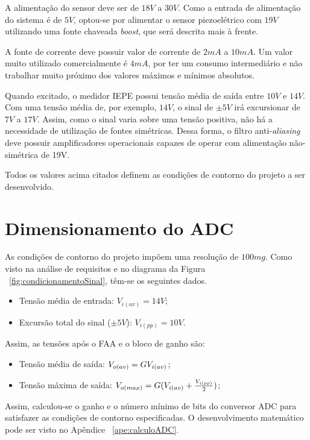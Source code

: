 \documentclass[
	12pt,				%
	openright,			%
	twoside,			%
	a4paper,			%
	english,			%
	french,				%
	spanish,			%
	brazil,				%
	]{abntex2}
\begin{document}
		A alimentação do sensor deve ser de $18V$ a $30V$. Como a entrada de
		alimentação do sistema é de $5V$, optou-se por alimentar o sensor
		piezoelétrico com $19V$ utilizando uma fonte chaveada \textit{boost}, que será
		descrita mais à frente.

		A fonte de corrente deve possuir valor de corrente de $2mA$ a $10mA$. Um valor muito
		utilizado comercialmente é $4mA$, por ter um consumo intermediário e não trabalhar
		muito próximo dos valores máximos e mínimos absolutos.

		Quando excitado, o medidor IEPE possui tensão média de saída entre $10V$ e $14V$. Com uma tensão média de, por exemplo, $14V$, o sinal de $\pm 5V$ irá excursionar de $7V$ a $17V$. Assim, como o sinal varia sobre uma tensão positiva, não há a necessidade de utilização de fontes simétricas. Dessa forma, o filtro
		anti-\textit{aliasing} deve possuir amplificadores operacionais	capazes de operar com alimentação não-simétrica de 19V.
		
		Todos os valores acima citados definem as condições de contorno do
		projeto a ser desenvolvido.	

	\section{Dimensionamento do ADC}
		
		As condições de contorno do projeto impõem uma resolução de $100mg$. Como
		visto na análise de requisitos e no diagrama da Figura ~\ref{fig:condicionamentoSinal},
		têm-se os seguintes dados.
		\begin{itemize}
			
			\item Tensão média de entrada: $V_{i(av)} = 14V$;
			\item Excursão total do sinal ($\pm5V$): $V_{i(pp)} = 10V$.
			
		\end{itemize}
		Assim, as tensões após o FAA e o bloco de ganho são:

		\begin{itemize}	
			\item Tensão média de saída: $V_{o(av)} = G\* V_{i(av)}$;
			\item Tensão máxima de saída: $V_{o(max)} = G\* (V_{i(av)} + \frac{V_{i(pp)}}{2})$;
		\end{itemize}	
			
		Assim, calculou-se o ganho e o número mínimo de bits do conversor ADC para satisfazer as condições de contorno especificadas. O desenvolvimento matemático pode ser visto no Apêndice ~\ref{ape:calculoADC}.
\end{document}
